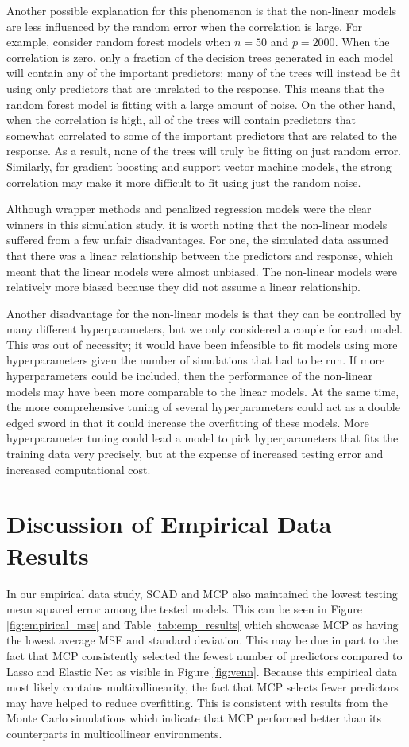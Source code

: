 \documentclass{article}
\begin{document}
Another possible explanation for this phenomenon is that the non-linear models are less influenced by the random error when the correlation is large. For example, consider random forest models when $n = 50$ and $p = 2000$. When the correlation is zero, only a fraction of the decision trees generated in each model will contain any of the important predictors; many of the trees will instead be fit using only predictors that are unrelated to the response. This means that the random forest model is fitting with a large amount of noise. On the other hand, when the correlation is high, all of the trees will contain predictors that somewhat correlated to some of the important predictors that are related to the response. As a result, none of the trees will truly be fitting on just random error. Similarly, for gradient boosting and support vector machine models, the strong correlation may make it more difficult to fit using just the random noise.

Although wrapper methods and penalized regression models were the clear winners in this simulation study, it is worth noting that the non-linear models suffered from a few unfair disadvantages. For one, the simulated data assumed that there was a linear relationship between the predictors and response, which meant that the linear models were almost unbiased. The non-linear models were relatively more biased because they did not assume a linear relationship. 

Another disadvantage for the non-linear models is that they can be controlled by many different hyperparameters, but we only considered a couple for each model. This was out of necessity; it would have been infeasible to fit models using more hyperparameters given the number of simulations that had to be run. If more hyperparameters could be included, then the performance of the non-linear models may have been more comparable to the linear models. At the same time, the more comprehensive tuning of several hyperparameters could act as a double edged sword in that it could increase the overfitting of these models. More hyperparameter tuning could lead a model to pick hyperparameters that fits the training data very precisely, but at the expense of increased testing error and increased computational cost.

\section{Discussion of Empirical Data Results}
In our empirical data study, SCAD and MCP also maintained the lowest testing mean squared error among the tested models. This can be seen in Figure \ref{fig:empirical_mse} and Table \ref{tab:emp_results} which showcase MCP as having the lowest average MSE and standard deviation. This may be due in part to the fact that MCP consistently selected the fewest number of predictors compared to Lasso and Elastic Net as visible in Figure \ref{fig:venn}. Because this empirical data most likely contains multicollinearity, the fact that MCP selects fewer predictors may have helped to reduce overfitting. This is consistent with results from the Monte Carlo simulations which indicate that MCP performed better than its counterparts in multicollinear environments.
\end{document}
